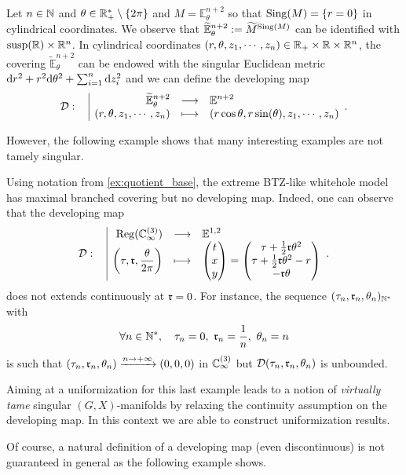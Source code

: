 \begin{ex} \label{ex:Tame}
 Let $n\in \mathbb{N}$ and $\theta\in \mathbb R_+^*\setminus \{2\pi\}$ and  $M = \mathbb E^{n+2}_{\theta}$ so that $\mathrm{Sing}(M) = \{r=0\}$ in cylindrical coordinates. 
 We observe that $\widetilde{\mathbb E}^{n+2}_{\theta} := \widetilde M^{\mathrm{Sing}(M)}$ can be identified with $\mathrm{susp}(\mathbb R)\times \mathbb R^{n}$.  In cylindrical coordinates $(r,\theta,z_1,\cdots,z_{n}) \in \mathbb R_+\times \mathbb R\times \mathbb R^{n}$, the covering $\widetilde{\mathbb E}^{n+2}_{\theta}$ can be endowed with the singular Euclidean metric $\mathrm{d} r^2 + r^2 \mathrm{d} \theta^2 + \sum_{i=1}^{n}\mathrm{d} z_i^2$ and we can define the developing map 
 $$\displaystyle\mathcal{D}:\begin{array}{l|rcl} & \displaystyle \widetilde{\mathbb E}^{n+2}_{\theta}  & \longrightarrow & \displaystyle \mathbb{E}^{n+2} \\ & \displaystyle (r,\theta,z_1,\cdots,z_{n}) & \longmapsto & \displaystyle  (r\cos\theta,r\sin(\theta),z_1,\cdots,z_n) \end{array}.$$
\end{ex}

However, the following example  shows that many interesting examples are not tamely singular.


\begin{ex}\label{ex:WTame}
 Using notation from \ref{ex:quotient_base}, the extreme BTZ-like whitehole model has maximal branched covering but no developing map. Indeed, one can observe that the developing map 
$$\displaystyle\mathcal{D}:\begin{array}{l|rcl} & \displaystyle \mathrm{Reg}(\mathbb{C}_\infty^{(3)}) & \longrightarrow & \displaystyle \mathbb{E}^{1,2} \\ & \displaystyle \left(\tau,\mathfrak{r},\frac{\theta}{2\pi}\right) & \longmapsto & \displaystyle 
\begin{pmatrix}t \\ x \\ y\end{pmatrix}=\begin{pmatrix} \tau + \frac{1}{2}\mathfrak{r}\theta^2 \\ \tau + \frac{1}{2}\mathfrak{r}\theta^2 -r \\ -\mathfrak{r}\theta  \end{pmatrix}
 \end{array}.$$
does not extends continuously at $\mathfrak{r} = 0$. For instance, the sequence $(\tau_n,\mathfrak{r}_n,\theta_n)_{\mathbb{N}^*}$ with 
$$\forall n\in \mathbb{N}^*, \quad \tau_n=0,~\mathfrak{r}_n=\frac{1}{n},~ \theta_n = n$$
is such that $(\tau_n,\mathfrak{r}_n,\theta_n)\xrightarrow{n\rightarrow +\infty} (0,0,0)$ in $\mathbb{C}_\infty^{(3)}$ but $\mathcal{D}(\tau_n,\mathfrak{r}_n,\theta_n)$ is unbounded.
\end{ex}

 Aiming at a uniformization for this last example  leads to a notion of {\it virtually tame} singular $(G,X)$-manifolds by relaxing the continuity assumption on the developing map. 
 In this context we are able to construct uniformization results.

Of course, a natural definition of a developing map (even discontinuous) is not guaranteed in general as the following example shows.

